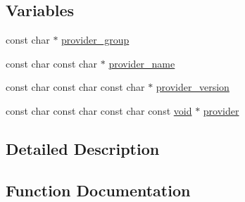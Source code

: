 \subsection*{Variables}
\begin{DoxyCompactItemize}
\item 
const char $\ast$ \hyperlink{group__APACHE__CORE__PROVIDER_ga18132929f57a6c2d0891c61c1c0cb8d7}{provider\+\_\+group}
\item 
const char const char $\ast$ \hyperlink{group__APACHE__CORE__PROVIDER_gac9b5b8486ecec94f244ca0a7dd0dada4}{provider\+\_\+name}
\item 
const char const char const char $\ast$ \hyperlink{group__APACHE__CORE__PROVIDER_ga291e44ce8408a927d2d5c4538fb0b600}{provider\+\_\+version}
\item 
const char const char const char const \hyperlink{group__MOD__ISAPI_gacd6cdbf73df3d9eed42fa493d9b621a6}{void} $\ast$ \hyperlink{group__APACHE__CORE__PROVIDER_gaf2965ad047e50f953739b8977445ed88}{provider}
\end{DoxyCompactItemize}


\subsection{Detailed Description}


\subsection{Function Documentation}
